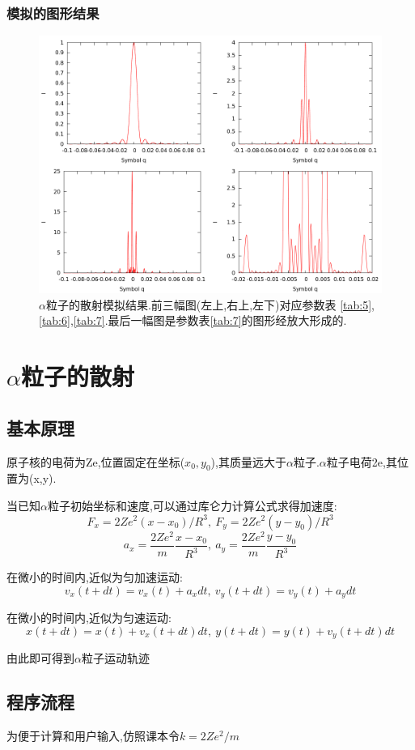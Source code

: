 \documentclass[10pt,a4paper]{article}
\begin{document}
\subsubsection{模拟的图形结果}
\begin{figure}[H]
\centering
\includegraphics[width=\textwidth]{../result/simulation2.png}
\caption{$\alpha$粒子的散射模拟结果.前三幅图(左上,右上,左下)对应参数表 \ref{tab:5},\ref{tab:6},\ref{tab:7}.最后一幅图是参数表\ref{tab:7}的图形经放大形成的.}
\end{figure}


\section{$\alpha$粒子的散射}
\subsection{基本原理}
原子核的电荷为Ze,位置固定在坐标($x_0,y_0$),其质量远大于$\alpha$粒子.$\alpha$粒子电荷2e,其位置为(x,y).

当已知$\alpha$粒子初始坐标和速度,可以通过库仑力计算公式求得加速度:
$$F_x=2Ze^2(x-x_0)/R^3,\ F_y=2Ze^2(y-y_0)/R^3$$
$$a_x=\frac{2Ze^2}{m}\frac{x-x_0}{R^3},\ a_y=\frac{2Ze^2}{m}\frac{y-y_0}{R^3}$$

在微小的时间内,近似为匀加速运动:
$$v_x(t+dt)=v_x(t)+a_xdt,\ v_y(t+dt)=v_y(t)+a_ydt$$

在微小的时间内,近似为匀速运动:
$$x(t+dt)=x(t)+v_x(t+dt)dt,\ y(t+dt)=y(t)+v_y(t+dt)dt$$

由此即可得到$\alpha$粒子运动轨迹

\subsection{程序流程}
为便于计算和用户输入,仿照课本令$k=2Ze^2/m$
\end{document}
